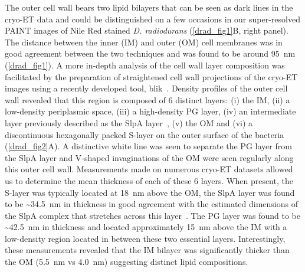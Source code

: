 The outer cell wall bears two lipid bilayers that can be seen as dark lines in the cryo-ET data and could be distinguished on a few occasions in our super-resolved PAINT images of Nile Red stained \textit{D. radiodurans} (\autoref{drad_fig1}B, right panel).
The distance between the inner (IM) and outer (OM) cell membranes was in good agreement between the two techniques and was found to be around \qty{95}{nm} (\autoref{drad_fig1}).
A more in-depth analysis of the cell wall layer composition was facilitated by the preparation of straightened cell wall projections of the cryo-ET images using a recently developed tool, blik~\cite{gaifasBlikExtensible3D2024}.
Density profiles of the outer cell wall revealed that this region is composed of 6 distinct layers: (i) the IM, (ii) a low-density periplasmic space, (iii) a high-density PG layer, (iv) an intermediate layer previously described as the SlpA layer~\cite{vonkugelgenMultidomainConnectorLinks2022}, (v) the OM and (vi) a discontinuous hexagonally packed S-layer on the outer surface of the bacteria (\autoref{drad_fig2}A).
A distinctive white line was seen to separate the PG layer from the SlpA layer and V-shaped invaginations of the OM were seen regularly along this outer cell wall.
Measurements made on numerous cryo-ET datasets allowed us to determine the mean thickness of each of these 6 layers.
When present, the S-layer was typically located at \qty{18}{nm} above the OM, the SlpA layer was found to be \sim\qty{34.5}{nm} in thickness in good agreement with the estimated dimensions of the SlpA complex that stretches across this layer~\cite{vonkugelgenMultidomainConnectorLinks2022}.
The PG layer was found to be \sim\qty{42.5}{nm} in thickness and located approximately \qty{15}{nm} above the IM with a low-density region located in between these two essential layers.
Interestingly, these measurements revealed that the IM bilayer was significantly thicker than the OM (\qty{5.5}{nm} vs \qty{4.0}{nm}) suggesting distinct lipid compositions.

